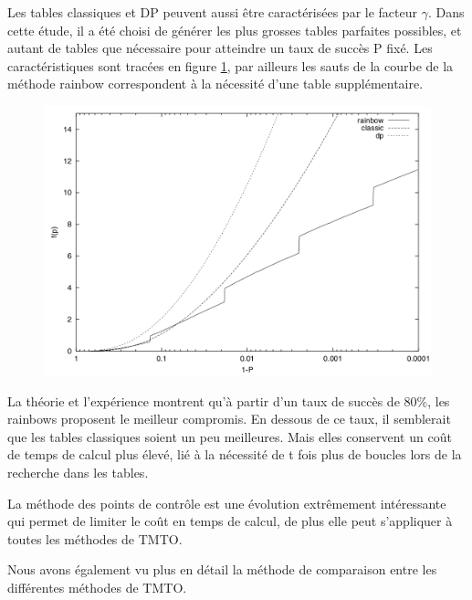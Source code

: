 	Les tables classiques et DP peuvent aussi être caractérisées par le facteur $\gamma$. Dans cette étude, il a été choisi de générer les plus grosses tables parfaites possibles, et autant de tables que nécessaire pour atteindre un taux de succès P fixé. Les caractéristiques sont tracées en figure \ref{fig:TMTO_carac}, par ailleurs les sauts de la courbe de la méthode \gls{rainbow} correspondent à la nécessité d'une table supplémentaire.

	\begin{figure}[H]
		\includegraphics[scale=0.25]{other/graph_gamma_P.png}
		\label{fig:TMTO_carac}
	\end{figure}

	La théorie et l'expérience montrent qu'à partir d'un taux de succès de 80\%, les \glspl{rainbow} proposent le meilleur compromis. En dessous de ce taux, il semblerait que les tables classiques soient un peu meilleures. Mais elles conservent un coût de temps de calcul plus élevé, lié à la nécessité de t fois plus de boucles lors de la recherche dans les tables.


	La méthode des points de contrôle est une évolution extrêmement intéressante qui permet de limiter le coût en temps de calcul, de plus elle peut s'appliquer à toutes les méthodes de \gls{TMTO}.

	\bigskip

	Nous avons également vu plus en détail la méthode de comparaison entre les différentes méthodes de \gls{TMTO}.

\endinput{}
